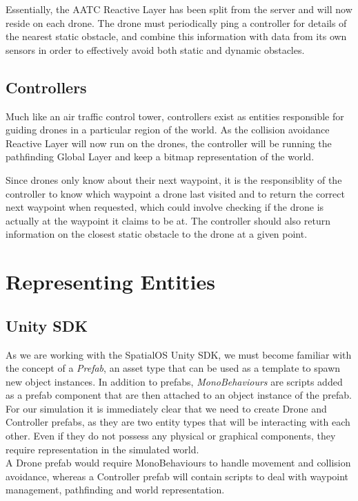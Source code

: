 \documentclass[a4paper,11pt,titlepage]{report}
\begin{document}
Essentially, the AATC Reactive Layer has been split from the server and will now reside on each drone. The drone must periodically ping a controller for details of the nearest static obstacle, and combine this information with data from its own sensors in order to effectively avoid both static and dynamic obstacles.

\subsection{Controllers}
Much like an air traffic control tower, controllers exist as entities responsible for guiding drones in a particular region of the world. As the collision avoidance Reactive Layer will now run on the drones, the controller will be running the pathfinding Global Layer and keep a bitmap representation of the world.

\clearpage
Since drones only know about their next waypoint, it is the responsiblity of the controller to know which waypoint a drone last visited and to return the correct next waypoint when requested, which could involve checking if the drone is actually at the waypoint it claims to be at. The controller should also return information on the closest static obstacle to the drone at a given point.

\section{Representing Entities}
\subsection{Unity SDK}
As we are working with the SpatialOS Unity SDK, we must become familiar with the concept of a \textit{Prefab}, an asset type that can be used as a template to spawn new object instances. In addition to prefabs, \textit{MonoBehaviours} are scripts added as a prefab component that are then attached to an object instance of the prefab.\\

For our simulation it is immediately clear that we need to create Drone and Controller prefabs, as they are two entity types that will be interacting with each other. Even if they do not possess any physical or graphical components, they require representation in the simulated world.\\

A Drone prefab would require MonoBehaviours to handle movement and collision avoidance, whereas a Controller prefab will contain scripts to deal with waypoint management, pathfinding and world representation.
\end{document}
